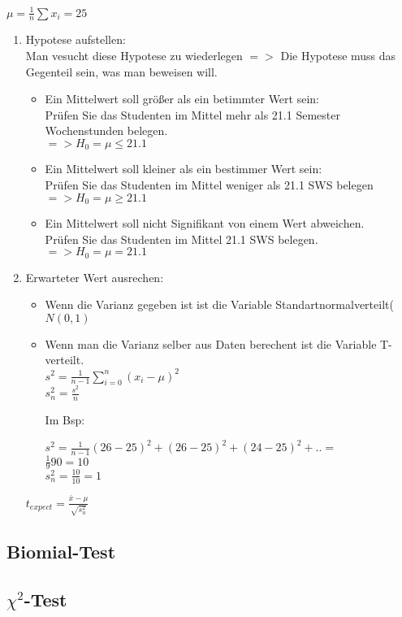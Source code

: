 \documentclass[a4paper, 11pt]{article}
\begin{document}
$\mu = \frac {1} {n} \sum x_i = 25$
\begin{enumerate}
  \item Hypotese aufstellen:\\
     Man vesucht diese Hypotese zu wiederlegen $=>$ Die Hypotese muss das Gegenteil sein, was man beweisen will.
     \begin {itemize}
       \item Ein Mittelwert soll größer als ein betimmter Wert sein:\\
         Prüfen Sie das Studenten im Mittel mehr als 21.1 Semester Wochenstunden belegen.\\
         $=> H_0 = \mu \leq 21.1$
       \item Ein Mittelwert soll kleiner als ein bestimmer Wert sein:\\
         Prüfen Sie das Studenten im Mittel weniger als 21.1 SWS belegen\\
         $=> H_0 = \mu \geq 21.1$
       \item Ein Mittelwert soll nicht Signifikant von einem Wert abweichen.\\
         Prüfen Sie das Studenten im Mittel 21.1 SWS belegen.\\
         $=> H_0 = \mu = 21.1$
     \end{itemize}

   \item Erwarteter Wert ausrechen: \\
     \begin {itemize}
       \item
         Wenn die Varianz gegeben ist ist die Variable Standartnormalverteilt($N(0,1)$ 
       \item 
         Wenn man die Varianz selber aus Daten berechent ist die Variable T-verteilt.\\
         $s^2 = \frac 1 {n-1} \sum_{i = 0} ^ n (x_i - \mu) ^2$\\
       $s_n^2 = \frac {s^2} n$

         Im Bsp: 

         $s^2 = \frac 1 {n-1} (26 - 25)^2 +(26 - 25)^2 + (24 - 25)^2 + ..  = $\\
         $      \frac 1 {9} 90 = 10$\\
         $s_n^2 = \frac {10} {10} = 1$

     \end {itemize}

     $ t_{expect} = \frac{\bar{x} - \mu} { \sqrt{s_n^2}}$
\end{enumerate}
\subsection{Biomial-Test}
\subsection{$\chi^2$-Test}
\end{document}

